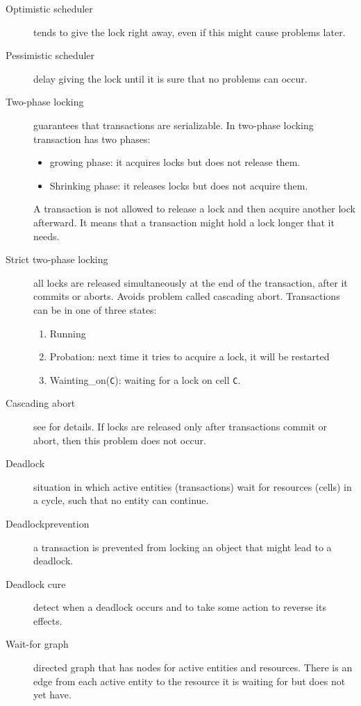\begin{description}
  \item[Optimistic scheduler] tends to give the lock right away, even if this might cause problems later.
  \item[Pessimistic scheduler] delay giving the lock until it is sure that no problems can occur.

  \item[Two-phase locking] guarantees that transactions are serializable.
    In two-phase locking transaction has two phases:
    \begin{itemize}
      \item growing phase: it acquires locks but does not release them.
      \item Shrinking phase: it releases locks but does not acquire them.
    \end{itemize}
    A transaction is not allowed to release a lock and then acquire another lock afterward.
    It means that a transaction might hold a lock longer that it needs.
  \item[Strict two-phase locking] all locks are released simultaneously at the end of the transaction, after it commits or aborts.
    Avoids problem called cascading abort.
    Transactions can be in one of three states:
    \begin{enumerate}
      \item Running
      \item Probation: next time it tries to acquire a lock, it will be restarted
      \item Wainting\_on(\lstinline|C|): waiting for a lock on cell \lstinline|C|.
    \end{enumerate}
  \item[Cascading abort] see \cite[p.~604]{van2004concepts} for details.
    If locks are released only after transactions commit or abort, then this problem does not occur.
  \item[Deadlock] situation in which active entities (transactions) wait for resources (cells) in a cycle, such that no entity can continue.
  \item[Deadlockprevention] a transaction is prevented from locking an object that might lead to a deadlock.
  \item[Deadlock cure] detect when a deadlock occurs and to take some action to reverse its effects.
  \item[Wait-for graph] directed graph that has nodes for active entities and resources.
    There is an edge from each active entity to the resource it is waiting for but does not yet have.

\end{description}
